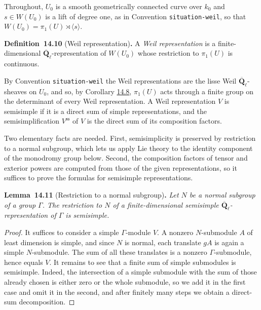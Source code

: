 \documentclass[11pt]{article}
\newenvironment{bpstatement}[2]{\par\addvspace{0.6\baselineskip}\noindent\textbf{#1}#2\textbf{.}\enspace\ignorespaces}
  {\par\addvspace{0.4\baselineskip}}
\newenvironment{bpstatementit}[2]{\begin{bpstatement}{#1}{#2}\itshape\ignorespaces}{\end{bpstatement}}
\newcommand{\bpslug}[1]{\texttt{#1}}
\begin{document}
Throughout, \(U_0\) is a smooth geometrically connected curve over \(k_0\) and \(s\in W(U_0)\) is a lift of degree one, as in Convention \bpslug{situation-{}\allowbreak{}weil}, so that \(W(U_0)=\pi_1(U)\rtimes\langle s\rangle\).

\label{bp35}%
\begin{bpstatement}{Definition~14.10}{ (Weil representation)}
A \emph{Weil representation} is a finite-dimensional \(\overline{\mathbf Q}_\ell\)-representation of \(W(U_0)\) whose restriction to \(\pi_1(U)\) is continuous.
\end{bpstatement}

\label{bp36}%
By Convention \bpslug{situation-{}\allowbreak{}weil} the Weil representations are the lisse Weil \(\overline{\mathbf Q}_\ell\)-sheaves on \(U_0\), and so, by Corollary \hyperref[bp27]{14.8}, \(\pi_1(U)\) acts through a finite group on the determinant of every Weil representation. A Weil representation \(V\) is semisimple if it is a direct sum of simple representations, and the semisimplification \(V^{\mathrm{ss}}\) of \(V\) is the direct sum of its composition factors.

Two elementary facts are needed. First, semisimplicity is preserved by restriction to a normal subgroup, which lets us apply Lie theory to the identity component of the monodromy group below. Second, the composition factors of tensor and exterior powers are computed from those of the given representations, so it suffices to prove the formulas for semisimple representations.

\label{bp37}%
\begin{bpstatementit}{Lemma~14.11}{ (Restriction to a normal subgroup)}
Let \(N\) be a normal subgroup of a group \(\Gamma\). The restriction to \(N\) of a finite-dimensional semisimple \(\overline{\mathbf Q}_\ell\)-representation of \(\Gamma\) is semisimple.
\end{bpstatementit}

\begin{proof}[{Proof}]\label{bp38}%
It suffices to consider a simple \(\Gamma\)-module \(V\). A nonzero \(N\)-submodule \(A\) of least dimension is simple, and since \(N\) is normal, each translate \(gA\) is again a simple \(N\)-submodule. The sum of all these translates is a nonzero \(\Gamma\)-submodule, hence equals \(V\). It remains to see that a finite sum of simple submodules is semisimple. Indeed, the intersection of a simple submodule with the sum of those already chosen is either zero or the whole submodule, so we add it in the first case and omit it in the second, and after finitely many steps we obtain a direct-sum decomposition.
\end{proof}
\end{document}
